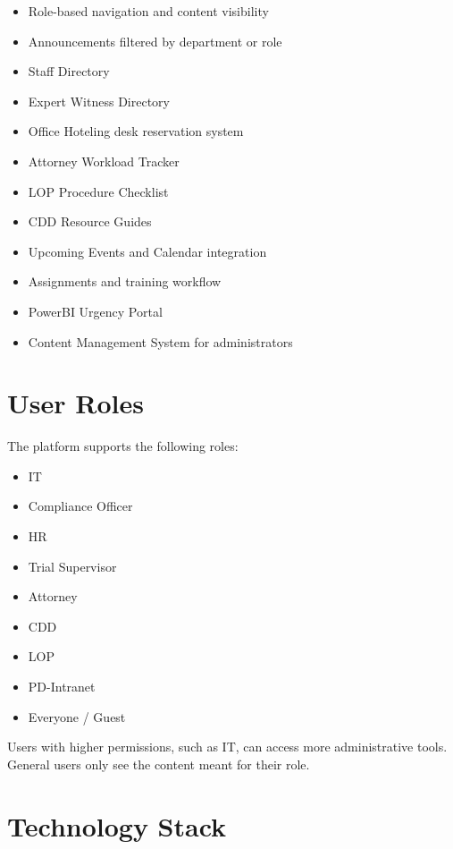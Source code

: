 \documentclass{article}
\begin{document}
\begin{itemize}
    \item Role-based navigation and content visibility
    \item Announcements filtered by department or role
    \item Staff Directory
    \item Expert Witness Directory
    \item Office Hoteling desk reservation system
    \item Attorney Workload Tracker
    \item LOP Procedure Checklist
    \item CDD Resource Guides
    \item Upcoming Events and Calendar integration
    \item Assignments and training workflow
    \item PowerBI Urgency Portal
    \item Content Management System for administrators
\end{itemize}

\section*{User Roles}

The platform supports the following roles:

\begin{itemize}
    \item IT
    \item Compliance Officer
    \item HR
    \item Trial Supervisor
    \item Attorney
    \item CDD
    \item LOP
    \item PD-Intranet
    \item Everyone / Guest
\end{itemize}

Users with higher permissions, such as IT, can access more administrative tools. General users only see the content meant for their role.

\section*{Technology Stack}
\end{document}
